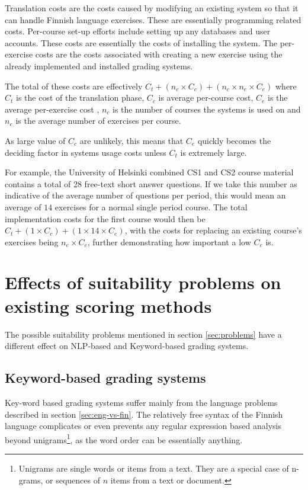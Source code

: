 \documentclass[english]{tktltiki2}
\theoremstyle{definition}
\theoremstyle{remark}
\begin{document}
Translation costs are the costs caused by modifying an existing system so that it can handle Finnish language exercises. These are essentially programming related costs. Per-course set-up efforts include setting up any databases and user accounts. These costs are essentially the costs of installing the system. The per-exercise costs are the costs associated with creating a new exercise using the already implemented and installed grading systems. 

The total of these costs are effectively $C_t + (n_c \times C_c) + (n_c \times n_e \times C_e)$ where $C_t$ is the cost of the translation phase, $C_c$ is average per-course cost, $C_e$ is the average per-exercise cost , $n_c$ is the number of courses the systems is used on and $n_e$ is the average number of exercises per course.

As large value of $C_c$ are unlikely, this means that $C_e$ quickly becomes the deciding factor in systems usage costs unless $C_t$ is extremely large. 

For example, the University of Helsinki combined CS1 and CS2 course material \cite{vihavainen14} contains a total of 28 free-text short answer questions. If we take this number as indicative of the average number of questions per period, this would mean an average of $14$ exercises for a normal single period course. The total implementation costs for the first course would then be $C_t + (1 \times C_c) + (1 \times 14 \times C_e)$, with the costs for replacing an existing course's exercises being $n_e \times C_e$, further demonstrating how important a low $C_e$ is.

\section{Effects of suitability problems on existing scoring methods}

The possible suitability problems mentioned in section \ref{sec:problems} have a different effect on NLP-based and Keyword-based grading systems.

\subsection{Keyword-based grading systems}

Key-word based grading systems suffer mainly from the language problems described in section \ref{sec:eng-vs-fin}. The relatively free syntax of the Finnish language complicates or even prevents any regular expression based analysis beyond unigrams\footnote{Unigrams are single words or items from a text. They are a special case of n-grams, or sequences of $n$ items from a text or document.}, as the word order can be essentially anything.
\end{document}
